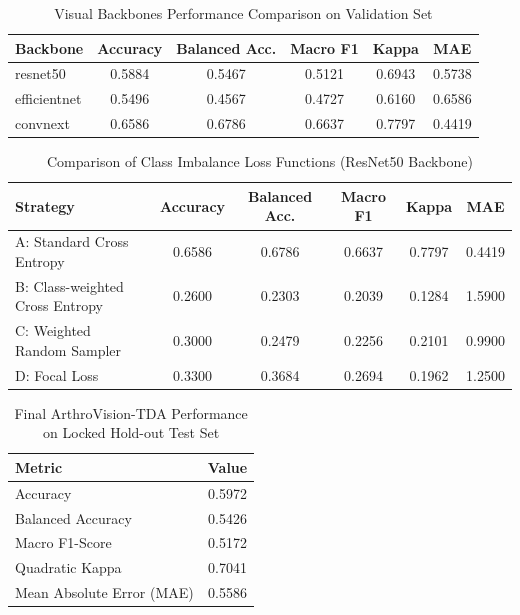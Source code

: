 
\begin{table}[h]
\centering
\caption{Visual Backbones Performance Comparison on Validation Set}
\begin{tabular}{lccccc}
\hline
Backbone & Accuracy & Balanced Acc. & Macro F1 & Kappa & MAE \\
\hline
resnet50 & 0.5884 & 0.5467 & 0.5121 & 0.6943 & 0.5738 \\
efficientnet & 0.5496 & 0.4567 & 0.4727 & 0.6160 & 0.6586 \\
convnext & 0.6586 & 0.6786 & 0.6637 & 0.7797 & 0.4419 \\
\hline
\end{tabular}
\end{table}

\begin{table}[h]
\centering
\caption{Comparison of Class Imbalance Loss Functions (ResNet50 Backbone)}
\begin{tabular}{lccccc}
\hline
Strategy & Accuracy & Balanced Acc. & Macro F1 & Kappa & MAE \\
\hline
A: Standard Cross Entropy & 0.6586 & 0.6786 & 0.6637 & 0.7797 & 0.4419 \\
B: Class-weighted Cross Entropy & 0.2600 & 0.2303 & 0.2039 & 0.1284 & 1.5900 \\
C: Weighted Random Sampler & 0.3000 & 0.2479 & 0.2256 & 0.2101 & 0.9900 \\
D: Focal Loss & 0.3300 & 0.3684 & 0.2694 & 0.1962 & 1.2500 \\
\hline
\end{tabular}
\end{table}

\begin{table}[h]
\centering
\caption{Final ArthroVision-TDA Performance on Locked Hold-out Test Set}
\begin{tabular}{lc}
\hline
Metric & Value \\
\hline
Accuracy & 0.5972 \\
Balanced Accuracy & 0.5426 \\
Macro F1-Score & 0.5172 \\
Quadratic Kappa & 0.7041 \\
Mean Absolute Error (MAE) & 0.5586 \\
\hline
\end{tabular}
\end{table}
